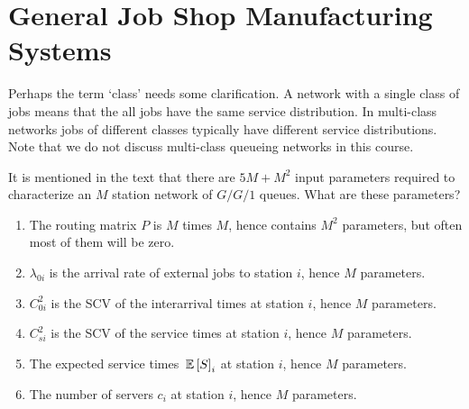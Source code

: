 

\section{General Job Shop Manufacturing Systems}
\label{sec:general-job-shop}

Perhaps the term `class' needs some clarification. A network with a
single class of jobs means that the all jobs have the same service
distribution. In multi-class networks jobs of different classes
typically have different service distributions. Note that we do not
discuss multi-class queueing networks in this course.

\begin{question}
  It is mentioned in the text that there are $5M+M^2$ input parameters
  required to characterize an $M$ station network of $G/G/1$ queues. What are these parameters?
  \begin{solution}
    \begin{enumerate}
    \item The routing matrix $P$ is $M$ times $M$, hence contains
      $M^2$ parameters, but often most of them will be zero.
    \item $\lambda_{0i}$ is the arrival rate of external jobs to station $i$, hence $M$ parameters.
    \item $C_{0i}^2$ is the SCV of the interarrival times at station
      $i$, hence $M$ parameters.
    \item $C_{si}^2$ is the SCV of the service times at station $i$,
      hence $M$ parameters.
    \item The expected service times $\,\mathbb{E}\left[S\right]_i$ at station $i$, 
      hence $M$ parameters.
    \item The number of servers $c_i$ at station $i$, hence $M$
      parameters.
    \end{enumerate}
  \end{solution}
\end{question}


